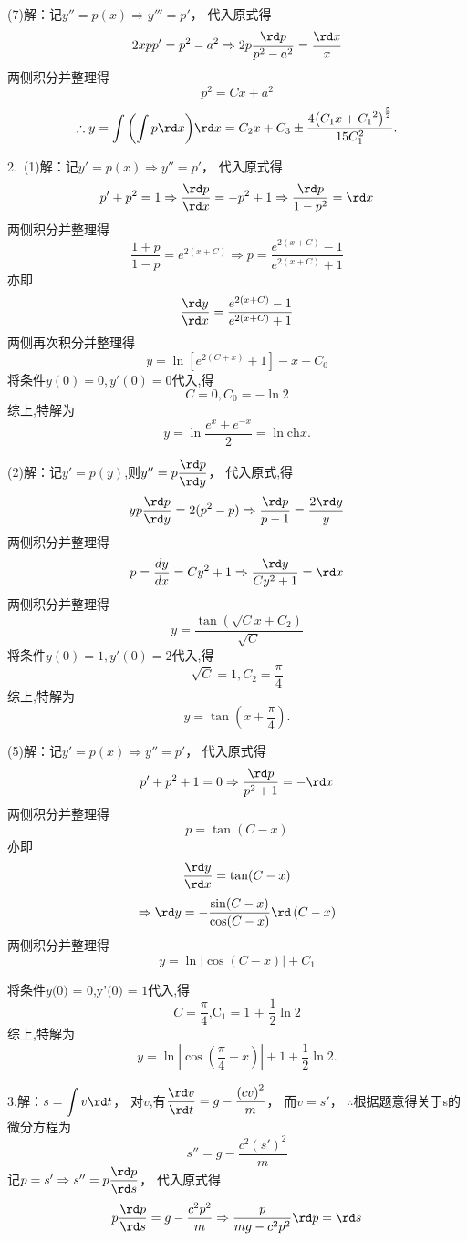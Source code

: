   (7)解：记$y'' = p(x) \Rightarrow y''' = p'$，
  代入原式得\[2xpp' = {p^2} - {a^2} \Rightarrow 2p\dfrac{{\rd p}}{{{p^2} - {a^2}}} = \dfrac{{\rd x}}{x}\]
  两侧积分并整理得\[{p^2} = Cx + {a^2}\]
  \[\therefore y = \int {\left( {\int {p\rd x} } \right)} \rd x = {C_2}x + {C_3} \pm \dfrac{{4{{\left( {{C_1}x + {C_1}^2} \right)}^{\frac{5}{2}}}}}{{15C_1^2}}.\]

  2.~(1)解：记$ y' = p\left( x \right) \Rightarrow y'' = p'$，
  代入原式得\[p' + {p^2} = 1 \Rightarrow \dfrac{{\rd p}}{{\rd x}} =  - {p^2} + 1 \Rightarrow \dfrac{{\rd p}}{{1 - {p^2}}} = \rd x\]
  两侧积分并整理得\[\dfrac{{1 + p}}{{1 - p}} = {e^{2(x + C)}} \Rightarrow p = \dfrac{{{e^{2(x + C)}} - 1}}{{{e^{2(x + C)}} + 1}}\]
  亦即\[\dfrac{{\rd y}}{{\rd x}} = \dfrac{{{e^{2(x + C)}} - 1}}{{{e^{2(x + C)}} + 1}}\]
  两侧再次积分并整理得\[y = \ln \left[ {{e^{2(C + x)}} + 1} \right] - x + {C_0}\]
  将条件$y\left( 0 \right) = 0,y'\left( 0 \right) = 0$代入,得
  \[C = 0,{C_0} =  - \ln 2\]
  综上,特解为\[y = \ln \dfrac{{{e^x} + {e^{ - x}}}}{2} = \ln \mathrm{ch} x.\]

  (2)解：记$y' = p\left( y \right)$,则$y'' = p\dfrac{{\rd p}}{{\rd y}}$，
  代入原式,得\[yp\dfrac{{\rd p}}{{\rd y}} = 2({p^2} - p) \Rightarrow \dfrac{{\rd p}}{{p - 1}} = \dfrac{{2\rd y}}{y}\]
  两侧积分并整理得\[p = \dfrac{{dy}}{{dx}} = C{y^2} + 1 \Rightarrow \dfrac{{\rd y}}{{C{y^2} + 1}} = \rd x\]
  两侧积分并整理得\[y = \dfrac{{\tan \left( {\sqrt C x + {C_2}} \right)}}{{\sqrt C }}\]
  将条件$y(0) = 1,y'\left( 0 \right) = 2$代入,得
  \[\sqrt C  = 1,{C_2} = \dfrac{\pi }{4}\]
  综上,特解为\[y = \tan \left( {x + \dfrac{\pi }{4}} \right).\]

  (5)解：记$ y' = p\left( x \right) \Rightarrow y'' = p'$，
  代入原式得\[p' + {p^2} + 1 = 0 \Rightarrow \dfrac{{\rd p}}{{{p^2} + 1}} =  - \rd x\]
  两侧积分并整理得\[p = \tan (C - x)\]
  亦即\[\dfrac{{\rd y}}{{\rd x}} = \tan (C - x)\]
  \[ \Rightarrow \rd y =  - \dfrac{{\sin (C - x)}}{{\cos (C - x)}}\rd \left( {C - x} \right)\]
  两侧积分并整理得
  \[y = \ln \left| {\cos (C - x)} \right| + {C_1}\]

  将条件$y(0{\text{) = 0,y'(0) = 1}}$代入,得\[C = \dfrac{\pi }{4}{\text{,}}{{\text{C}}_1} = 1{\text{ + }}\dfrac{1}{2}\ln 2\]
  综上,特解为
  \[y = \ln \left| {\cos \left( {\dfrac{\pi }{4} - x} \right)} \right| + 1 + \dfrac{1}{2}\ln 2.\]

  3.解：$s = \displaystyle\int {v\rd t} $，
  对$v$,有$\dfrac{{\rd v}}{{\rd t}} = g - \dfrac{{{{(cv)}^2}}}{m}$，
  而$v = s'$，
  $\therefore$根据题意得关于s的微分方程为 \[s'' = g - \dfrac{{{c^2}{{(s')}^2}}}{m}\]
  记$p = s' \Rightarrow s'' = p\dfrac{{\rd p}}{{\rd s}}$，
  代入原式得
  \[p\dfrac{{\rd p}}{{\rd s}} = g - \dfrac{{{c^2}{p^2}}}{m} \Rightarrow \dfrac{p}{{mg - {c^2}{p^2}}}\rd p = \rd s\]


